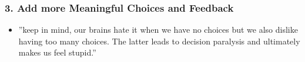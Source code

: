 \subsubsection{3. Add more Meaningful Choices and Feedback}
\begin{itemize}
    \item ''keep in mind, our brains hate it when we have no choices but we also dislike having too many choices. The latter leads to decision paralysis and ultimately makes us feel stupid.''
\end{itemize}